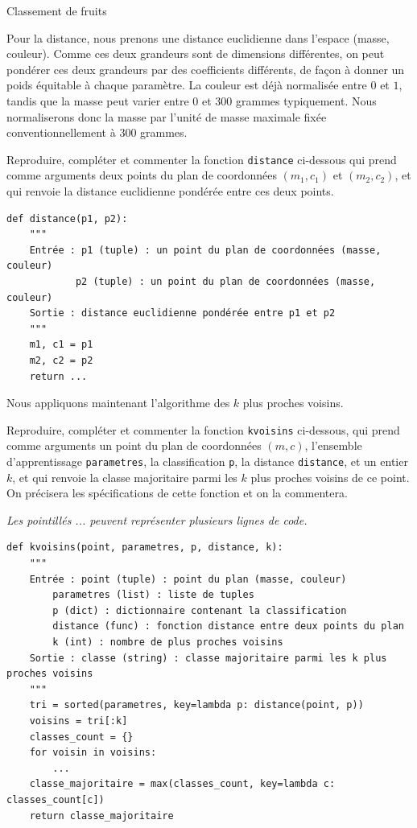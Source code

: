 \begin{exo}[PC][2][devoir]{Classement de fruits}
  
  Pour la distance, nous prenons une distance euclidienne dans l’espace (masse, couleur). Comme ces deux grandeurs sont de dimensions différentes, on peut pondérer ces deux grandeurs par des coefficients différents, de façon à donner un poids équitable à chaque paramètre. La couleur est déjà normalisée entre $0$ et $1$, tandis que la masse peut varier entre $0$ et $300$ grammes typiquement. Nous normaliserons donc la masse par l'unité de masse maximale fixée conventionnellement à $300$ grammes.
  \begin{quest}
    \item	Reproduire, compléter et commenter la fonction \texttt{distance} ci-dessous qui prend comme arguments deux points du plan  de coordonnées $(m_1,c_1)$ et $(m_2,c_2)$, et qui renvoie la distance euclidienne pondérée entre ces deux points.
     
     \begin{verbatim}
def distance(p1, p2):
    """
    Entrée : p1 (tuple) : un point du plan de coordonnées (masse, couleur)
            p2 (tuple) : un point du plan de coordonnées (masse, couleur)
    Sortie : distance euclidienne pondérée entre p1 et p2
    """
    m1, c1 = p1
    m2, c2 = p2
    return ...
    \end{verbatim}


  \end{quest}

  Nous appliquons maintenant l'algorithme des $k$ plus proches voisins.
  \begin{quest}
    \item	Reproduire, compléter et commenter la fonction \texttt{kvoisins} ci-dessous, qui prend comme arguments un point du plan de coordonnées $(m,c)$, l'ensemble d'apprentissage \texttt{parametres}, la classification \texttt{p}, la distance \texttt{distance}, et un entier $k$, et qui renvoie la classe majoritaire parmi les $k$ plus proches voisins de ce point. On précisera les spécifications de cette fonction et on la commentera.

    \emph{Les pointillés ... peuvent représenter plusieurs lignes de code.}


    \begin{verbatim}
def kvoisins(point, parametres, p, distance, k):
    """
    Entrée : point (tuple) : point du plan (masse, couleur)
        parametres (list) : liste de tuples
        p (dict) : dictionnaire contenant la classification
        distance (func) : fonction distance entre deux points du plan
        k (int) : nombre de plus proches voisins
    Sortie : classe (string) : classe majoritaire parmi les k plus proches voisins
    """
    tri = sorted(parametres, key=lambda p: distance(point, p))
    voisins = tri[:k]
    classes_count = {}
    for voisin in voisins:
        ...
    classe_majoritaire = max(classes_count, key=lambda c: classes_count[c])
    return classe_majoritaire
    \end{verbatim}



\end{quest}
\end{exo}
